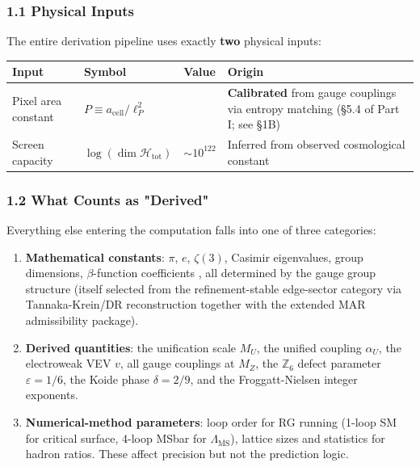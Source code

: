 \subsubsection{1.1 Physical Inputs}\label{11-physical-inputs}

The entire derivation pipeline uses exactly \textbf{two} physical inputs:

{\def\LTcaptype{none} %
\begin{longtable}[]{@{}>{\RaggedRight\arraybackslash}p{}>{\RaggedRight\arraybackslash}p{}>{\RaggedRight\arraybackslash}p{}>{\RaggedRight\arraybackslash}p{}@{}}
\toprule\noalign{}
Input & Symbol & Value & Origin \\
\midrule\noalign{}
\endhead
\bottomrule\noalign{}
\endlastfoot
Pixel area constant & \(P \equiv a_{\text{cell}}/\ell_P^2\) & 1.63094 & \textbf{Calibrated} from gauge couplings via entropy matching (§5.4 of Part I; see §1B) \\
Screen capacity & \(\log(\dim\mathcal{H}_{\text{tot}})\) & \(\sim 10^{122}\) & Inferred from observed cosmological constant \\
\end{longtable}
}

\subsubsection{1.2 What Counts as "Derived"}\label{12-what-counts-as-derived}

Everything else entering the computation falls into one of three categories:

\begin{enumerate}
\def\labelenumi{\arabic{enumi}.}
\item
  \textbf{Mathematical constants}: \(\pi\), \(e\), \(\zeta(3)\), Casimir eigenvalues, group dimensions, \(\beta\)-function coefficients , all determined by the gauge group structure (itself selected from the refinement-stable edge-sector category via Tannaka-Krein/DR reconstruction together with the extended MAR admissibility package).
\item
  \textbf{Derived quantities}: the unification scale \(M_U\), the unified coupling \(\alpha_U\), the electroweak VEV \(v\), all gauge couplings at \(M_Z\), the \(\mathbb{Z}_6\) defect parameter \(\varepsilon = 1/6\), the Koide phase \(\delta = 2/9\), and the Froggatt-Nielsen integer exponents.
\item
  \textbf{Numerical-method parameters}: loop order for RG running (1-loop SM for critical surface, 4-loop MSbar for \(\Lambda_{\overline{\text{MS}}}\)), lattice sizes and statistics for hadron ratios. These affect precision but not the prediction logic.
\end{enumerate}

